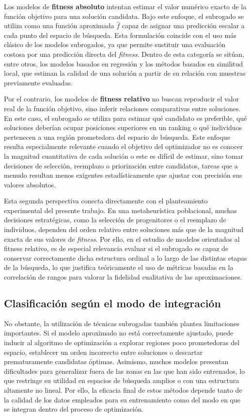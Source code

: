 Los modelos de \textbf{fitness absoluto} intentan estimar el valor numérico exacto de la función objetivo para una solución candidata. Bajo este enfoque, el subrogado se utiliza como una función aproximada \(\hat{f}\) capaz de asignar una predicción escalar a cada punto del espacio de búsqueda. Esta formulación coincide con el uso más clásico de los modelos subrogados, ya que permite sustituir una evaluación costosa por una predicción directa del \textit{fitness}. Dentro de esta categoría se sitúan, entre otros, los modelos basados en regresión y los métodos basados en similitud local, que estiman la calidad de una solución a partir de su relación con muestras previamente evaluadas.

Por el contrario, los modelos de \textbf{fitness relativo} no buscan reproducir el valor real de la función objetivo, sino inferir relaciones comparativas entre soluciones. En este caso, el subrogado se utiliza para estimar qué candidato es preferible, qué soluciones deberían ocupar posiciones superiores en un ranking o qué individuos pertenecen a una región prometedora del espacio de búsqueda. Este enfoque resulta especialmente relevante cuando el objetivo del optimizador no es conocer la magnitud cuantitativa de cada solución o este es difícil de estimar, sino tomar decisiones de selección, reemplazo o priorización entre candidatos, tareas que a menudo resultan menos exigentes estadísticamente que ajustar con precisión sus valores absolutos.

Esta segunda perspectiva conecta directamente con el planteamiento experimental del presente trabajo. En una metaheurística poblacional, muchas decisiones estratégicas, como la selección de progenitores o el reemplazo de individuos, dependen del orden relativo entre soluciones más que de la magnitud exacta de sus valores de \textit{fitness}. Por ello, en el estudio de modelos orientados al fitness relativo, es de especial relevancia evaluar si el subrogado es capaz de conservar correctamente dicha estructura ordinal a lo largo de las distintas etapas de la búsqueda, lo que justifica teóricamente el uso de métricas basadas en la correlación de rangos para valorar la fidelidad cualitativa de las aproximaciones.

\subsection{Clasificación según el modo de integración}

No obstante, la utilización de técnicas subrogadas también plantea limitaciones importantes. Si el modelo aproximado no está correctamente ajustado, puede inducir al algoritmo de optimización a explorar regiones poco prometedoras del espacio, establecer un orden incorrecto entre soluciones o descartar prematuramente candidatas óptimas. Asimismo, muchos modelos presentan dificultades para generalizar fuera de las zonas en las que han sido entrenados, lo que restringe su utilidad en espacios de búsqueda amplios o con una estructura altamente no lineal. Por ello, la eficacia final de estos métodos depende tanto de la calidad de los datos empleados para su entrenamiento como del modo en que se integran dentro del proceso de optimización.

